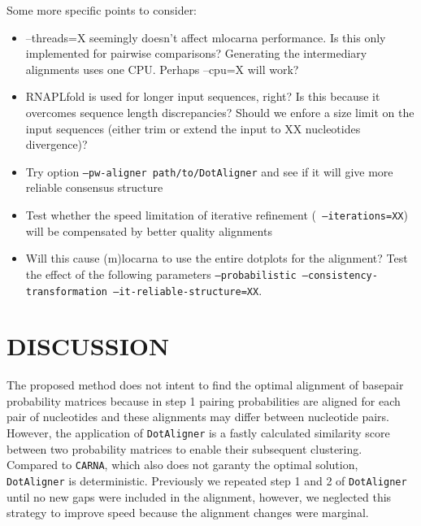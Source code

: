 \documentclass[a4paper,twoside]{article}
\newcommand\dotaligner{\texttt{DotAligner}}
\newcommand\carna{\texttt{CARNA}}
\begin{document}
Some more specific points to consider: 
\begin{itemize}
\item --threads=X seemingly doesn't affect mlocarna performance. Is this only implemented for pairwise comparisons? 
Generating the intermediary alignments uses one CPU. Perhaps --cpu=X will work? 
\item RNAPLfold is used for longer input sequences, right? Is this because it overcomes sequence length discrepancies? 
Should we enfore a size limit on the input sequences (either trim or extend the input to XX nucleotides divergence)?
\item Try option \texttt{--pw-aligner path/to/DotAligner} and see if it will give more reliable consensus structure
\item Test whether the speed limitation of iterative refinement (\texttt{ --iterations=XX}) will be compensated by 
better quality alignments
\item Will this cause (m)locarna to use the entire dotplots for the alignment? Test the effect of the following 
parameters \texttt{--probabilistic --consistency-transformation --it-reliable-structure=XX}. 
\end{itemize} 

\section{\uppercase{Discussion}}

\noindent The proposed method does not intent to find the optimal alignment of
basepair probability matrices because in step 1 pairing probabilities are
aligned for each pair of nucleotides  and these alignments may differ between
nucleotide pairs. However, the application of \dotaligner{} is a fastly
calculated similarity score between two probability matrices to enable their
subsequent clustering.  Compared to \carna{}, which also does not garanty the
optimal solution, \dotaligner{} is deterministic. Previously we repeated step 1
and 2 of \dotaligner{} until no new gaps were included in the alignment,
however, we neglected this strategy to improve speed because the alignment
changes were marginal.
\end{document}
